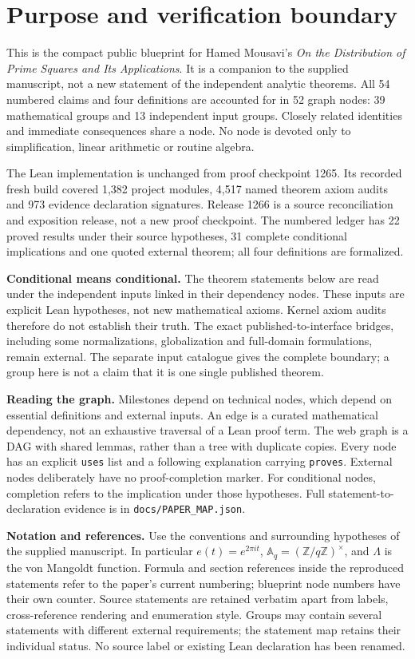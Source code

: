 \section*{Purpose and verification boundary}
This is the compact public blueprint for Hamed Mousavi's
\emph{On the Distribution of Prime Squares and Its Applications}.
It is a companion to the supplied manuscript, not a new statement of the
independent analytic theorems. All 54 numbered claims and four definitions
are accounted for in 52 graph nodes: 39 mathematical groups and 13 independent
input groups. Closely related identities and immediate consequences share a
node. No node is devoted only to simplification, linear arithmetic or routine
algebra.

The Lean implementation is unchanged from proof checkpoint 1265.
Its recorded fresh build covered 1,382 project modules, 4,517 named theorem
axiom audits and 973 evidence declaration signatures. Release 1266 is a
source reconciliation and exposition release, not a new proof checkpoint.
The numbered ledger has 22 proved results under their source hypotheses,
31 complete conditional implications and one quoted external theorem;
all four definitions are formalized.

\textbf{Conditional means conditional.}
The theorem statements below are read under the independent inputs linked
in their dependency nodes. These inputs are explicit Lean hypotheses, not
new mathematical axioms. Kernel axiom audits therefore do not establish
their truth. The exact published-to-interface bridges, including some
normalizations, globalization and full-domain formulations, remain external.
The separate input catalogue gives the complete boundary; a group here is
not a claim that it is one single published theorem.

\textbf{Reading the graph.}
Milestones depend on technical nodes, which depend on essential definitions
and external inputs. An edge is a curated mathematical dependency, not an
exhaustive traversal of a Lean proof term. The web graph is a DAG with shared
lemmas, rather than a tree with duplicate copies. Every node has an explicit
\texttt{uses} list and a following explanation carrying
\texttt{proves}. External nodes deliberately have no proof-completion
marker. For conditional nodes, completion refers to the implication under
those hypotheses. Full statement-to-declaration evidence is in
\texttt{docs/PAPER\_MAP.json}.

\textbf{Notation and references.}
Use the conventions and surrounding hypotheses of the supplied manuscript.
In particular $e(t)=e^{2\pi it}$, $\mathbb A_q=(\mathbb Z/q\mathbb Z)^\times$,
and $\Lambda$ is the von Mangoldt function. Formula and section references
inside the reproduced statements refer to the paper's current numbering;
blueprint node numbers have their own counter. Source statements are retained
verbatim apart from labels, cross-reference rendering and enumeration style.
Groups may contain several statements with different external requirements;
the statement map retains their individual status. No source label or
existing Lean declaration has been renamed.

